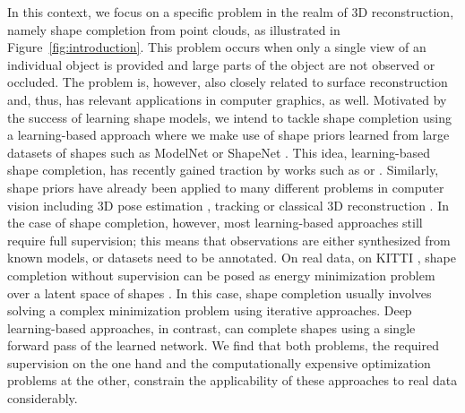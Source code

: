 In this context, we focus on a specific problem in the realm of 3D reconstruction,
namely shape completion from point clouds, as
illustrated in Figure~\ref{fig:introduction}. This problem occurs when only a single view
of an individual object is provided and large parts of the object
are not observed or occluded. The problem is, however, also closely related to
surface reconstruction \cite{BergerSilva:2014} and, thus, has relevant applications
in computer graphics, as well. Motivated by the success of learning shape models,
we intend to tackle shape completion using a learning-based approach where
we make use of shape priors learned from large datasets of shapes
such as ModelNet \cite{WuSongXiao:2015} or ShapeNet \cite{ChangFunkhouserGuibasSavarese:2015}.
This idea, \ie learning-based shape completion, has recently gained traction
by works such as \cite{RieglerGeiger:2017,SmithMeger:2017,DaiNiessner:2016,
SharmaFritz:2016,FanSuGuibas:2016} or \cite{RezendeHeess:2016}.
Similarly, shape priors have already been
applied to many different problems in computer vision including 3D pose estimation
\cite{AdrianReid:2012,DambrevilleTannenbaum:2008,SandhuTannenbaum:2009,MenzeHeipkeGeiger:2015},
tracking \cite{MaSibley:2014,LeottaMundy:2009} or classical 3D reconstruction
\cite{GueneyGeiger:2015,DameReid:2013,BaoSavarese:2013}. In the case of shape completion,
however, most learning-based approaches still require full supervision; this means that
observations are either synthesized from known models, or datasets need to be annotated.
On real data, \eg on KITTI \cite{GeigerLenzUrtasun:2012,GeigerLenzStillerUrtasun:2013},
shape completion without supervision can be posed as energy minimization
problem over a latent space of shapes \cite{EngelmannStuecklerLeibe:2016,
BaoSavarese:2013,DameReid:2013}. In this case, shape completion usually
involves solving a complex minimization problem using iterative approaches.
Deep learning-based approaches, in contrast, can complete shapes using a single
forward pass of the learned network. We find
that both problems, the required supervision on the one hand and the computationally
expensive optimization problems at the other, constrain the applicability of
these approaches to real data considerably.

